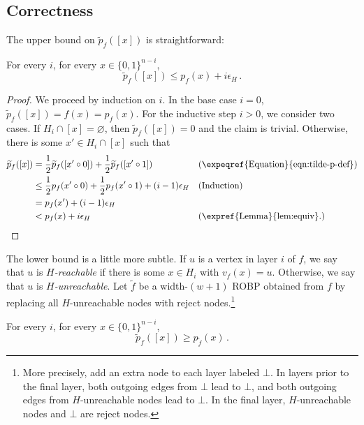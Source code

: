 \subsection{Correctness}

The upper bound on $\widetilde{p}_f([x])$ is straightforward:
\begin{claim} \label{clm:const-width-ub}
For every $i$, for every $x \in \{0, 1\}^{n - i}$,
$$
\widetilde{p}_f([x]) \leq p_f(x) + i \epsilon_H\,.
$$
\end{claim}

\begin{proof}
We proceed by induction on $i$. In the base case $i = 0$, $\widetilde{p}_f([x]) = f(x) = p_f(x)$. For the inductive step $i > 0$, we consider two cases. If $H_i \cap [x] = \varnothing$, then $\widetilde{p}_f([x]) = 0$ and the claim is trivial. Otherwise, there is some $x' \in H_i \cap [x]$ such that
\begin{align*}
\widetilde{p}_f([x]) &= \frac{1}{2} \widetilde{p}_f([x' \circ 0]) + \frac{1}{2} \widetilde{p}_f([x' \circ 1]) && (\text{\expeqref{Equation}{eqn:tilde-p-def}}) \\
&\leq \frac{1}{2} p_f(x' \circ 0) + \frac{1}{2} p_f(x' \circ 1) + (i - 1) \epsilon_H && \text{(Induction)} \\
&= p_f(x') + (i - 1) \epsilon_H \\
&< p_f(x) + i \epsilon_H && \text{(\expref{Lemma}{lem:equiv}.)} \qedhere
\end{align*}
\end{proof}

The lower bound is a little more subtle. If $u$ is a vertex in layer $i$ of $f$, we say that $u$ is \emph{$H$-reachable} if there is some $x \in H_i$ with $v_f(x) = u$. Otherwise, we say that $u$ is \emph{$H$-unreachable}. Let $\widetilde{f}$ be a width-$(w + 1)$ ROBP obtained from $f$ by replacing all $H$-unreachable nodes with reject nodes.\footnote{More precisely, add an extra node to each layer labeled $\bot$. In layers prior to the final layer, both outgoing edges from $\bot$ lead to $\bot$, and both outgoing edges from $H$-unreachable nodes lead to $\bot$. In the final layer, $H$-unreachable nodes and $\bot$ are reject nodes.}

\begin{claim} \label{clm:const-width-lb}
For every $i$, for every $x \in \{0, 1\}^{n - i}$,
$$
\widetilde{p}_f([x]) \geq p_{\widetilde{f}}(x)\,.
$$
\end{claim}

